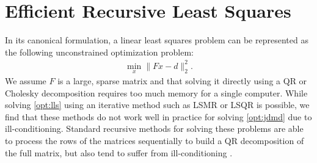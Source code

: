 \documentclass[../root.tex]{subfiles}
\begin{document}

\section{Efficient Recursive Least Squares} \label{sec:rls}
In its canonical formulation, a linear least squares problem can be represented as the
following unconstrained optimization problem:
\begin{align} \label{opt:lls}
  \min_x \|Fx - d\|_2^2.
\end{align}
We assume $F$ is a large, sparse matrix and that solving it directly using a QR or Cholesky
decomposition requires too much memory for a single computer. While solving \eqref{opt:lls}
using an iterative method such as LSMR \cite{fong_LSMR_2011} or LSQR \cite{paige_LSQR_1982}
 is possible,
we find that these methods do not work well in practice for solving \eqref{opt:jdmd} due to
ill-conditioning.  Standard recursive methods for solving these problems are able to process
the rows of the matrices sequentially to build a QR decomposition of the full matrix, but
also tend to suffer from ill-conditioning 
\cite{strobach_Recursive_1990,sayed_Recursive_2009,ghirnikar_Stable_1990}.
\end{document}
